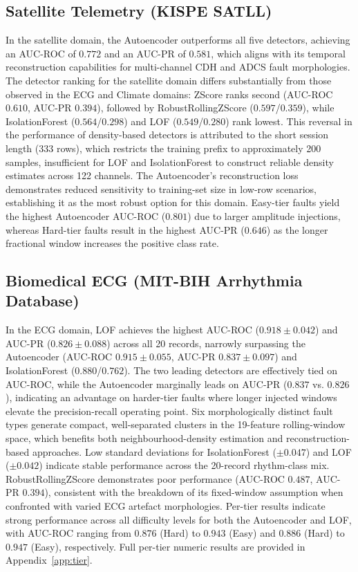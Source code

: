 \documentclass[conference]{IEEEtran}
\begin{document}
\subsection{Satellite Telemetry (KISPE SATLL)}

In the satellite domain, the Autoencoder outperforms all five detectors, achieving an AUC-ROC of $0.772$ and an AUC-PR of $0.581$, which aligns with its temporal reconstruction capabilities for multi-channel CDH and ADCS fault morphologies. The detector ranking for the satellite domain differs substantially from those observed in the ECG and Climate domains: ZScore ranks second (AUC-ROC $0.610$, AUC-PR $0.394$), followed by RobustRollingZScore ($0.597$/$0.359$), while IsolationForest ($0.564$/$0.298$) and LOF ($0.549$/$0.280$) rank lowest. This reversal in the performance of density-based detectors is attributed to the short session length (333 rows), which restricts the training prefix to approximately 200 samples, insufficient for LOF and IsolationForest to construct reliable density estimates across 122 channels. The Autoencoder's reconstruction loss demonstrates reduced sensitivity to training-set size in low-row scenarios, establishing it as the most robust option for this domain. Easy-tier faults yield the highest Autoencoder AUC-ROC ($0.801$) due to larger amplitude injections, whereas Hard-tier faults result in the highest AUC-PR ($0.646$) as the longer fractional window increases the positive class rate.

\subsection{Biomedical ECG (MIT-BIH Arrhythmia Database)}

In the ECG domain, LOF achieves the highest AUC-ROC ($0.918 \pm 0.042$) and AUC-PR ($0.826 \pm 0.088$) across all 20 records, narrowly surpassing the Autoencoder (AUC-ROC $0.915 \pm 0.055$, AUC-PR $0.837 \pm 0.097$) and IsolationForest ($0.880$/$0.762$). The two leading detectors are effectively tied on AUC-ROC, while the Autoencoder marginally leads on AUC-PR ($0.837$ vs. $0.826$), indicating an advantage on harder-tier faults where longer injected windows elevate the precision-recall operating point. Six morphologically distinct fault types generate compact, well-separated clusters in the 19-feature rolling-window space, which benefits both neighbourhood-density estimation and reconstruction-based approaches. Low standard deviations for IsolationForest ($\pm 0.047$) and LOF ($\pm 0.042$) indicate stable performance across the 20-record rhythm-class mix. RobustRollingZScore demonstrates poor performance (AUC-ROC $0.487$, AUC-PR $0.394$), consistent with the breakdown of its fixed-window assumption when confronted with varied ECG artefact morphologies. Per-tier results indicate strong performance across all difficulty levels for both the Autoencoder and LOF, with AUC-ROC ranging from $0.876$ (Hard) to $0.943$ (Easy) and $0.886$ (Hard) to $0.947$ (Easy), respectively. Full per-tier numeric results are provided in Appendix~\ref{app:tier}.
\end{document}
